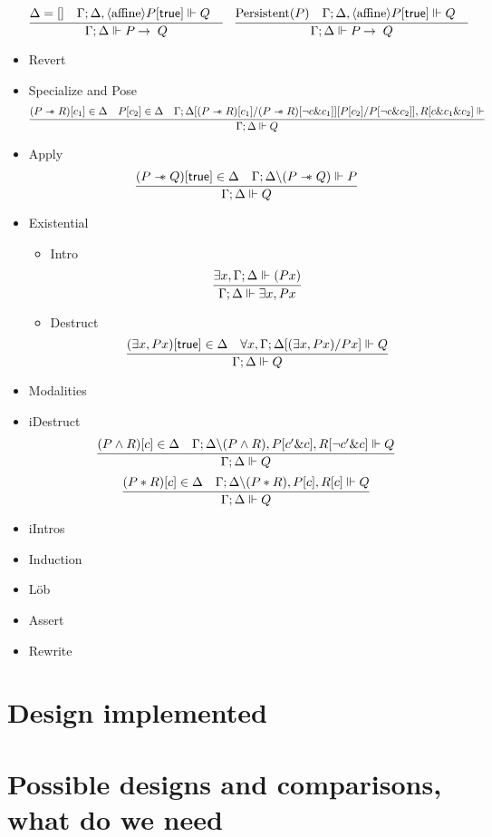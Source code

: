 \begin{itemize}
  \begin{equation*}
  \infer{\entailsD P \imp Q}
        {\SpatD = [] &
          \entails {\IntuD} {\SpatD , \affine P[\true]} {Q} &
        }
   \quad
  \infer{\entailsD P \imp Q}
        {\Persistent P &
         \entails {\IntuD} {\SpatD , \affine P[\true]} {Q} &
        }
  \end{equation*}
\item Revert
\item Specialize and Pose
  $$
  \infer{\entailsD Q}
        {(P \wand R)[c_1] \in \SpatD &
         P[c_2] \in \SpatD &
         \entails{\IntuD}{\SpatD [(P \wand R)[c_1] /
                                  (P \wand R)[\neg c \& c_1]]
                                 [P[c_2] / P [\neg c \& c_2]],
                                 R[c \& c_1 \& c_2]}}
  $$
\item Apply
  $$
  \infer{\entailsD Q}
        {(P \wand Q)[\true] \in \SpatD &
         \entails \IntuD {\SpatD \backslash (P \wand Q)} {P}}
  $$
\item Existential
  \begin{itemize}
  \item Intro
    $$
    \infer{\entailsD \exists x, P x}
          {\exists x, \entailsD (P x)}
    $$
  \item Destruct
    $$
    \infer{\entailsD Q}
          {(\exists x, P x)[\true] \in \SpatD &
           \forall x, \entails \IntuD {\SpatD [(\exists x, P x) / P x]} Q}
    $$
  \end{itemize}
\item Modalities
\item iDestruct
  $$
  \infer{\entailsD Q}
        {(P \wedge R)[c] \in \SpatD &
         \entails {\IntuD} {\SpatD \backslash (P \wedge R), P[c' \& c], R [\neg c' \& c]} Q}
  $$
  $$
  \infer{\entailsD Q}
        {(P \ast R)[c] \in \SpatD &
         \entails {\IntuD} {\SpatD \backslash (P \ast R), P[c], R [c]} Q}
  $$
\item iIntros
\item Induction
\item Löb
\item Assert
\item Rewrite
\end{itemize}

\section{Design implemented}

\section{Possible designs and comparisons, what do we need}

